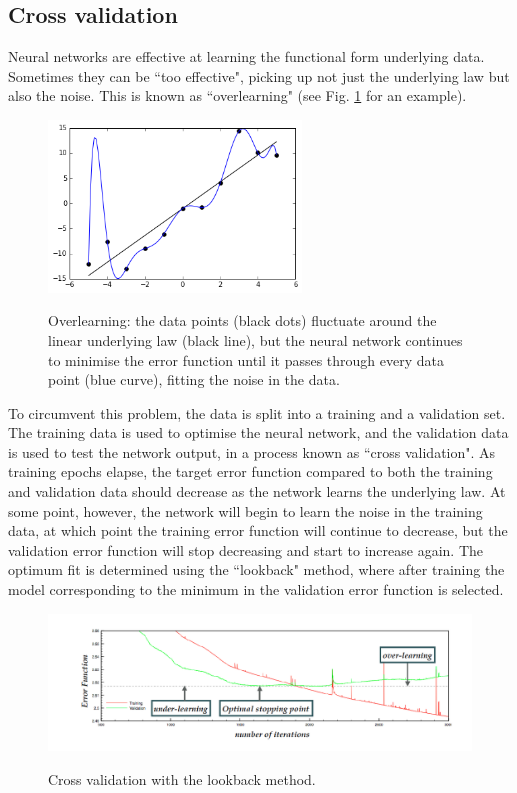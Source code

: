 \subsection{Cross validation}
Neural networks are effective at learning the functional form underlying data. Sometimes they can be ``too effective", picking up not just the underlying law but also the noise. This is known as ``overlearning" (see Fig. \ref{fig:overlearning} for an example).

\begin{figure}[H]
\centering
\includegraphics[width=0.6\textwidth]{background/overfitteddata.png}
\label{fig:overlearning}
\caption{Overlearning: the data points (black dots) fluctuate around the linear underlying law (black line), but the neural network continues to minimise the error function until it passes through every data point (blue curve), fitting the noise in the data.}
\end{figure}

To circumvent this problem, the data is split into a training and a validation set. The training data is used to optimise the neural network, and the validation data is used to test the network output, in a process known as ``cross validation". As training epochs elapse, the target error function compared to both the training and validation data should decrease as the network learns the underlying law. At some point, however, the network will begin to learn the noise in the training data, at which point the training error function will continue to decrease, but the validation error function will stop decreasing and start to increase again. The optimum fit is determined using the ``lookback" method, where after training the model corresponding to the minimum in the validation error function is selected.

\begin{figure}[H]
\centering
\includegraphics[width=\textwidth]{background/crossvalidation.png}
\label{fig:crossvalidation}
\caption{Cross validation with the lookback method.}
\end{figure}

